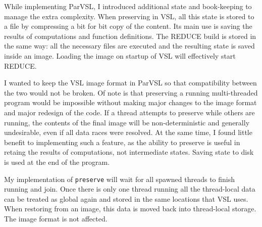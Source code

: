 While implementing ParVSL, I introduced additional state and book-keeping to manage the extra complexity.
When preserving in VSL, all this state is stored to a file by compressing a bit for bit copy of the
content. Its main use is saving the results of computations and function definitions.
The REDUCE build is stored in the same way: all the necessary files are executed and the resulting
state is saved inside an image. Loading the image on startup of VSL will effectively start REDUCE.

I wanted to keep the VSL image format in ParVSL so that compatibility between the two would not be broken.
Of note is that preserving a running multi-threaded program would be impossible without making major changes
to the image format and major redesign of the code. If a thread attempts to preserve while others
are running, the contents of the final image will be non-deterministic and generally undesirable,
even if all data races were resolved. At the same time, I found little benefit to implementing such
a feature, as the ability to preserve is useful in retaing the results of computations, not intermediate states.
Saving state to disk is used at the end of the program.

My implementation of \verb|preserve| will wait
for all spawned threads to finish running and join. Once there is only one thread running all the
thread-local data can be treated as global again and stored in the same locations that
VSL uses. When restoring from an image, this data is moved back into thread-local storage. The image
format is not affected.
